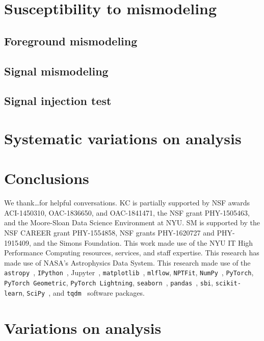 \documentclass[prd,aps,10pt,nofootinbib,twocolumn,superscriptaddress,preprintnumbers,balancelastpage,longbibliography]{revtex4-1}
\begin{document}
\section{Susceptibility to mismodeling}
\label{sec:mismodeling}

\subsection{Foreground mismodeling}
\label{sec:fg-mismodeling}

\subsection{Signal mismodeling}
\label{sec:sig-mismodeling}

\subsection{Signal injection test}
\label{sec:sig-injection}

\section{Systematic variations on analysis}
\label{sec:systematics}

\section{Conclusions}
\label{sec:conclusion}

\vspace{.3cm}

\begin{acknowledgments}

We thank\ldots for helpful conversations.  
KC is partially supported by NSF awards ACI-1450310, OAC-1836650, and OAC-1841471, the NSF grant PHY-1505463, and the Moore-Sloan Data Science Environment at NYU. 
SM is supported by the NSF CAREER grant PHY-1554858, NSF grants PHY-1620727 and PHY-1915409, and the Simons Foundation. 
This work made use of the NYU IT High Performance Computing resources, services, and staff expertise. 
This research has made use of NASA's Astrophysics Data System. 
This research made use of the \texttt{astropy}~\cite{Price-Whelan:2018hus,Robitaille:2013mpa}, \texttt{IPython}~\cite{PER-GRA:2007}, Jupyter~\cite{Kluyver2016JupyterN}, \texttt{matplotlib}~\cite{Hunter:2007}, \texttt{mlflow}, \texttt{NPTFit}, \texttt{NumPy}~\cite{numpy:2011}, \texttt{PyTorch}, \texttt{PyTorch Geometric}, \texttt{PyTorch Lightning}, \texttt{seaborn}~\cite{seaborn}, \texttt{pandas}~\cite{pandas:2010}, \texttt{sbi}, \texttt{scikit-learn}, \texttt{SciPy}~\cite{2020SciPy-NMeth}, and \texttt{tqdm}~\cite{da2019tqdm}  software packages. 
\end{acknowledgments}

\appendix

\section{Variations on analysis}
\label{app:variations}



\end{document}
